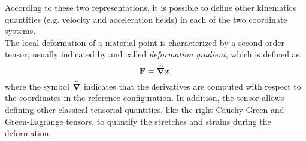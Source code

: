According to these two representations, it is possible
to define other kinematics quantities (e.g. velocity and acceleration
fields) in each of the two coordinate systems.\\ The local deformation
of a material point is characterized by a second order tensor, usually
indicated by \F and called \textit{deformation gradient}, which is
defined as:
\begin{equation}
  \textbf{F} = \widehat{\boldsymbol{\nabla}}\underline{x},
  \label{eq:tensorF}
\end{equation}
where the symbol $\widehat{\boldsymbol{\nabla}}$ indicates that the
derivatives are computed with respect to the coordinates in the
reference configuration. In addition, the tensor \F allows defining
other classical tensorial quantities, like the right Cauchy-Green and
Green-Lagrange tensors, to quantify the stretches and strains during
the deformation.\\

